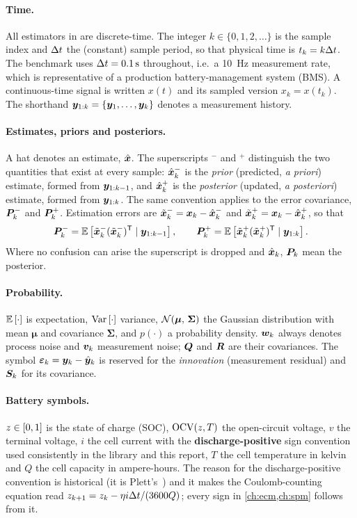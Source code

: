 \paragraph{Time.} All estimators in \estkit{} are discrete-time. The integer $k\in\{0,1,2,\dots\}$
is the sample index and $\Delta t$ the (constant) sample period, so that physical time is $t_k = k\Delta t$.
The benchmark uses $\Delta t = \SI{0.1}{\second}$ throughout, i.e.\ a \SI{10}{\hertz} measurement rate,
which is representative of a production battery-management system (BMS). A continuous-time
signal is written $x(t)$ and its sampled version $x_k = x(t_k)$. The shorthand
$\bm{y}_{1:k} = \{\bm{y}_1,\dots,\bm{y}_k\}$ denotes a measurement history.

\paragraph{Estimates, priors and posteriors.} A hat denotes an estimate, $\hat{\bm{x}}$. The
superscripts $^-$ and $^+$ distinguish the two quantities that exist at every sample: $\hat{\bm{x}}^{-}_k$
is the \emph{prior} (predicted, \emph{a priori}) estimate, formed from $\bm{y}_{1:k-1}$, and
$\hat{\bm{x}}^{+}_k$ is the \emph{posterior} (updated, \emph{a posteriori}) estimate, formed from
$\bm{y}_{1:k}$. The same convention applies to the error covariance, $\bm{P}^{-}_k$ and $\bm{P}^{+}_k$.
Estimation errors are $\tilde{\bm{x}}^-_k = \bm{x}_k - \hat{\bm{x}}^{-}_k$ and
$\tilde{\bm{x}}^+_k = \bm{x}_k - \hat{\bm{x}}^{+}_k$, so that
\begin{equation}
\bm{P}^{-}_k = \mathbb{E}\left[\tilde{\bm{x}}^-_k(\tilde{\bm{x}}^-_k)^{\mathsf{T}}\mid\bm{y}_{1:k-1}\right],\qquad
\bm{P}^{+}_k = \mathbb{E}\left[\tilde{\bm{x}}^+_k(\tilde{\bm{x}}^+_k)^{\mathsf{T}}\mid\bm{y}_{1:k}\right] .
\label{eq:prelim-Pdef}
\end{equation}
Where no confusion can arise the superscript is dropped and $\hat{\bm{x}}_k$, $\bm{P}_k$ mean the posterior.

\paragraph{Probability.} $\mathbb{E}\left[\cdot\right]$ is expectation, $\operatorname{Var}\left[\cdot\right]$ variance,
$\mathcal{N}\!\left(\bm{\mu},\,\bm\Sigma\right)$ the Gaussian distribution with mean $\bm\mu$ and covariance
$\bm\Sigma$, and $p(\cdot)$ a probability density. $\bm{w}_k$ always denotes process noise and
$\bm{v}_k$ measurement noise; $\bm{Q}$ and $\bm{R}$ are their covariances. The symbol
$\bm{\varepsilon}_k = \bm{y}_k - \hat{\bm{y}}_k$ is reserved for the \emph{innovation} (measurement residual) and
$\bm{S}_k$ for its covariance.

\paragraph{Battery symbols.} $z\in[0,1]$ is the state of charge (SOC), $\mathrm{OCV}(z,T)$ the
open-circuit voltage, $v$ the terminal voltage, $i$ the cell current with the
\textbf{discharge-positive} sign convention used consistently in the library and this report,
$T$ the cell temperature in kelvin and $Q$ the cell capacity in ampere-hours. The reason for the
discharge-positive convention is historical (it is Plett's~\cite{plett2004ekf1,plett2015bms1})
and it makes the Coulomb-counting equation read $z_{k+1} = z_k - \eta i\Delta t/(3600Q)$;
every sign in \cref{ch:ecm,ch:spm} follows from it.

